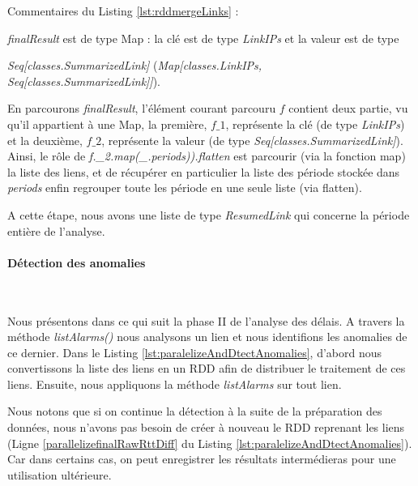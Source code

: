 Commentaires  du Listing \ref{lst:rddmergeLinks} :

\noindent \textit{finalResult} est de type Map  : la clé est de type \textit{LinkIPs} et la valeur est de type

\noindent \textit{Seq[classes.SummarizedLink]} (\textit{Map[classes.LinkIPs, Seq[classes.SummarizedLink]]}).

\noindent En parcourons  \textit{finalResult}, l'élément courant parcouru $f$ contient deux partie, vu qu'il appartient à une Map, la première, $ f\_1 $, représente la clé (de type \textit{LinkIPs})  et la deuxième,  $ f\_2 $, représente la valeur (de type  \textit{Seq[classes.SummarizedLink]}).  Ainsi, le rôle de \textit{f.\_2.map(\_.periods)).flatten} est parcourir (via la fonction map) la liste des liens, et de récupérer en particulier la liste des période stockée dans \textit{periods} enfin regrouper toute les période en une seule liste (via flatten).


A cette étape, nous avons une liste de type \textit{ResumedLink} qui concerne  la période entière de l'analyse. 



\paragraph{Détection des anomalies}~

Nous présentons dans ce qui suit la phase II de l'analyse des délais. A travers la méthode \textit{listAlarms()} nous analysons un lien et nous identifions les anomalies de ce dernier. Dans le Listing \ref{lst:paralelizeAndDtectAnomalies}, d'abord nous convertissons la liste des liens en un RDD afin de distribuer le traitement de ces liens. Ensuite, nous appliquons la méthode \textit{listAlarms} sur tout lien. 

Nous notons que si on continue la détection à la suite de la préparation des données, nous n'avons pas besoin de créer à nouveau le RDD reprenant les liens (Ligne \ref{parallelizefinalRawRttDiff} du Listing \ref{lst:paralelizeAndDtectAnomalies}). Car dans certains cas, on peut enregistrer les résultats intermédieras pour une utilisation ultérieure. 

